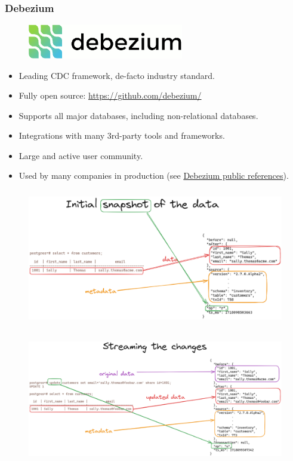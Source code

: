 \documentclass[10pt,utf8]{beamer}
\begin{document}
\begin{frame}
   \frametitle{Debezium}
   \begin{figure}
        \centering
        \includegraphics[height=1.5cm]{./img/debezium.eps}
    \end{figure}
    
    \vspace{0.5cm}
    
   \begin{itemize}
     \item Leading CDC framework, de-facto industry standard.
     \item Fully open source: \textcolor{blue}{\url{https://github.com/debezium/}}
     \item Supports all major databases, including non-relational databases.
     \item Integrations with many 3rd-party tools and frameworks.
     \item Large and active user community.
     \item Used by many companies in production (see \textcolor{blue}{\href{https://debezium.io/community/users/}{Debezium public references}}).
   \end{itemize}
\end{frame}


\begin{frame}
    \begin{figure}
        \centering
        \includegraphics[height=6cm]{./img/initial_snapshot_data.eps}
    \end{figure}
\end{frame}

\begin{frame}
    \begin{figure}
        \centering
        \includegraphics[height=5.5cm]{./img/update_data.eps}
    \end{figure}
\end{frame}
\end{document}

